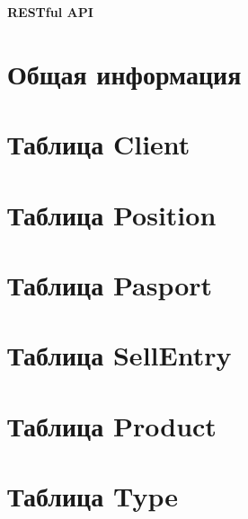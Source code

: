 \documentclass[14pt,a4paper,report]{report}
\let\Oldpart\part
\newcommand{\parttitle}{}
\renewcommand{\part}[1]{\Oldpart{#1}\renewcommand{\parttitle}{#1}}
\begin{document}
\begin{titlepage}
\vspace*{\fill}
    \begin{center}
      \textbf{\Huge RESTful API}

    \end{center}
    \vspace*{\fill}
\end{titlepage}

\setcounter{page}{2}

\def\contentsname{Содержание}
\tableofcontents \label{toc}
\clearpage


\part{Общая информация} 




\part{Таблица Client}




\part{Таблица Position}




\part{Таблица Pasport}




\part{Таблица SellEntry}



\part{Таблица Product}




\part{Таблица Type}

\end{document}
